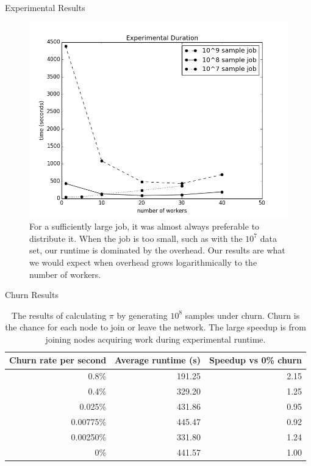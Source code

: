 \documentclass[11pt]{beamer}
\begin{document}
\begin{frame}{Experimental Results}

	\begin{figure}
	    \includegraphics[width=0.65\linewidth]{figs/expTime}
	    \caption{For a sufficiently large job, it was almost always preferable to distribute it.  When the job is too small, such as with the $10^{7}$ data set, our runtime is dominated by the overhead.  Our results are what we would expect when overhead grows logarithmically to the number of workers.}
	    \label{expTime}
	\end{figure}


\end{frame}



\begin{frame}{Churn Results}
	\begin{table}
		\centering
		\begin{tabular}{|r|r|r|} 
			\hline 
			Churn rate per second & Average runtime (s) & Speedup vs 0\% churn\\ \hline{}
			0.8\% & 191.25 & 2.15 \\ \hline
			0.4\% & 329.20 & 1.25 \\ \hline
			0.025\% & 431.86 & 0.95 \\ \hline 
			0.00775\%  & 445.47 & 0.92 \\ \hline 
			0.00250\% & 331.80  &  1.24 \\ \hline 
			0\% & 441.57 & 1.00 \\ \hline
		\end{tabular}
		\caption{The results of calculating $\pi$ by generating $10^8$ samples under churn. Churn is the chance for each node to join or leave the network. The large speedup is from joining nodes acquiring work during experimental runtime.} 
		\label{tab:churnSpeed}
	\end{table}
	
\end{frame}
\end{document}
